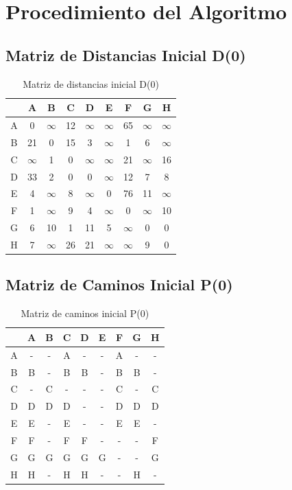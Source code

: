 \documentclass[12pt]{article}
\begin{document}
\clearpage
\section{Procedimiento del Algoritmo}
\subsection{Matriz de Distancias Inicial D(0)}
\begin{table}[h!]
\centering
\begin{tabular}{|c|c|c|c|c|c|c|c|c|}
\hline
 & A & B & C & D & E & F & G & H \\\hline
A & 0 & $\infty$ & 12 & $\infty$ & $\infty$ & 65 & $\infty$ & $\infty$ \\\hline
B & 21 & 0 & 15 & 3 & $\infty$ & 1 & 6 & $\infty$ \\\hline
C & $\infty$ & 1 & 0 & $\infty$ & $\infty$ & 21 & $\infty$ & 16 \\\hline
D & 33 & 2 & 0 & 0 & $\infty$ & 12 & 7 & 8 \\\hline
E & 4 & $\infty$ & 8 & $\infty$ & 0 & 76 & 11 & $\infty$ \\\hline
F & 1 & $\infty$ & 9 & 4 & $\infty$ & 0 & $\infty$ & 10 \\\hline
G & 6 & 10 & 1 & 11 & 5 & $\infty$ & 0 & 0 \\\hline
H & 7 & $\infty$ & 26 & 21 & $\infty$ & $\infty$ & 9 & 0 \\\hline
\end{tabular}
\caption{Matriz de distancias inicial D(0)}
\end{table}

\clearpage
\subsection{Matriz de Caminos Inicial P(0)}
\begin{table}[h!]
\centering
\begin{tabular}{|c|c|c|c|c|c|c|c|c|}
\hline
 & A & B & C & D & E & F & G & H \\\hline
A & - & - & A & - & - & A & - & - \\\hline
B & B & - & B & B & - & B & B & - \\\hline
C & - & C & - & - & - & C & - & C \\\hline
D & D & D & D & - & - & D & D & D \\\hline
E & E & - & E & - & - & E & E & - \\\hline
F & F & - & F & F & - & - & - & F \\\hline
G & G & G & G & G & G & - & - & G \\\hline
H & H & - & H & H & - & - & H & - \\\hline
\end{tabular}
\caption{Matriz de caminos inicial P(0)}
\end{table}
\end{document}
